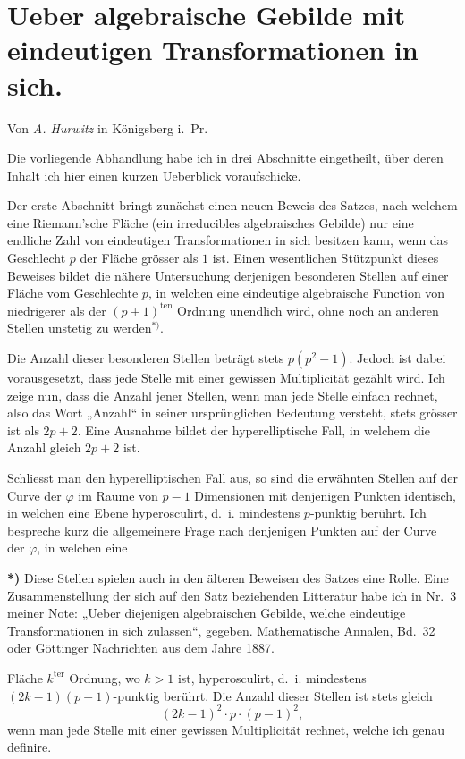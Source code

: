 \documentclass{article}
\begin{document}
\section*{Ueber algebraische Gebilde mit eindeutigen Transformationen in sich.}

Von \emph{A. Hurwitz} in Königsberg i.~Pr.

Die vorliegende Abhandlung habe ich in drei Abschnitte eingetheilt, über deren Inhalt ich hier einen kurzen Ueberblick voraufschicke.

Der erste Abschnitt bringt zunächst einen neuen Beweis des Satzes, nach welchem eine Riemann'sche Fläche (ein irreducibles algebraisches Gebilde) nur eine endliche Zahl von eindeutigen Transformationen in sich besitzen kann, wenn das Geschlecht $p$ der Fläche grösser als $1$ ist. Einen wesentlichen Stützpunkt dieses Beweises bildet die nähere Untersuchung derjenigen besonderen Stellen auf einer Fläche vom Geschlechte $p$, in welchen eine eindeutige algebraische Function von niedrigerer als der $(p+1)^{\text{ten}}$ Ordnung unendlich wird, ohne noch an anderen Stellen unstetig zu werden${}^{*)}$.

Die Anzahl dieser besonderen Stellen beträgt stets $p(p^2 - 1)$. Jedoch ist dabei vorausgesetzt, dass jede Stelle mit einer gewissen Multiplicität gezählt wird. Ich zeige nun, dass die Anzahl jener Stellen, wenn man jede Stelle einfach rechnet, also das Wort „Anzahl“ in seiner ursprünglichen Bedeutung versteht, stets grösser ist als $2p+2$. Eine Ausnahme bildet der hyperelliptische Fall, in welchem die Anzahl gleich $2p+2$ ist.

Schliesst man den hyperelliptischen Fall aus, so sind die erwähnten Stellen auf der Curve der $\varphi$ im Raume von $p-1$ Dimensionen mit denjenigen Punkten identisch, in welchen eine Ebene hyperosculirt, d.~i. mindestens $p$-punktig berührt. Ich bespreche kurz die allgemeinere Frage nach denjenigen Punkten auf der Curve der $\varphi$, in welchen eine

\textbf{*)} Diese Stellen spielen auch in den älteren Beweisen des Satzes eine Rolle. Eine Zusammenstellung der sich auf den Satz beziehenden Litteratur habe ich in Nr.~3 meiner Note: „Ueber diejenigen algebraischen Gebilde, welche eindeutige Transformationen in sich zulassen“, gegeben. Mathematische Annalen, Bd.~32 oder Göttinger Nachrichten aus dem Jahre 1887.

Fläche $k^{\text{ter}}$ Ordnung, wo $k > 1$ ist, hyperosculirt, d.~i. mindestens $(2k-1)(p-1)$-punktig berührt. Die Anzahl dieser Stellen ist stets gleich
\[
(2k-1)^2 \cdot p \cdot (p-1)^2,
\]
wenn man jede Stelle mit einer gewissen Multiplicität rechnet, welche ich genau definire.
\end{document}
